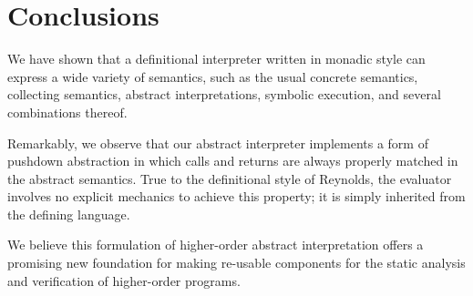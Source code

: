 \section{Conclusions}

We have shown that a definitional interpreter written in monadic style
can express a wide variety of semantics, such as the usual concrete
semantics, collecting semantics, abstract interpretations, symbolic
execution, and several combinations thereof. 

Remarkably, we observe that our abstract interpreter implements a form
of pushdown abstraction in which calls and returns are always properly
matched in the abstract semantics.  True to the definitional style of
Reynolds, the evaluator involves no explicit mechanics to achieve this
property; it is simply inherited from the defining language.

We believe this formulation of higher-order abstract interpretation
offers a promising new foundation for making re-usable components for
the static analysis and verification of higher-order programs.
